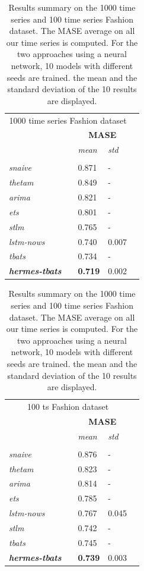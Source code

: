 \documentclass[lettersize,journal]{IEEEtran}
\begin{document}
\begin{table}
  \caption{Results summary on the 1000 time series and 100 time series Fashion dataset. The MASE average on all our time series is computed. For the two approaches using a neural network, 10 models with different seeds are trained. the mean and the standard deviation of the 10 results are displayed.}
  \centering
  \begin{tabular}{l||llll}
    \multicolumn{4}{c}{1000 time series Fashion dataset}\vspace{0.5cm} \\
    &&\multicolumn{2}{c}{\textbf{MASE}} \\
    &&  \textit{mean}  & \textit{std}  \\
	 \hline
	 &&& \\
     \textit{snaive} && 0.871 & - \\
     \textit{thetam}  && 0.849 & - \\
     \textit{arima} && 0.821 & - \\
     \textit{ets} && 0.801 & - \\
     \textit{stlm} && 0.765 & - \\
     \textit{lstm-nows} && 0.740 & 0.007 \\
     \textit{tbats} && 0.734 & - \\
     \textbf{\textit{hermes-tbats}} && \textbf{0.719} & 0.002 \\
  \end{tabular}

\vspace{.2cm}

  \begin{tabular}{l||llll}
   \multicolumn{4}{c}{100 ts Fashion dataset}\vspace{0.5cm} \\
   &&\multicolumn{2}{c}{\textbf{MASE}} \\
    &&  \textit{mean}  & \textit{std}  \\
	\hline
	 &&& \\
     \textit{snaive} && 0.876 & - \\
     \textit{thetam}  && 0.823 & - \\
     \textit{arima} && 0.814 & - \\
     \textit{ets} && 0.785 & - \\
     \textit{lstm-nows} && 0.767 & 0.045 \\
     \textit{stlm} && 0.742 & - \\
     \textit{tbats} && 0.745 & - \\
     \textbf{\textit{hermes-tbats}} && \textbf{0.739} & 0.003 \\
  \end{tabular}
\label{tab:1000metricresults}
\end{table}
\end{document}
